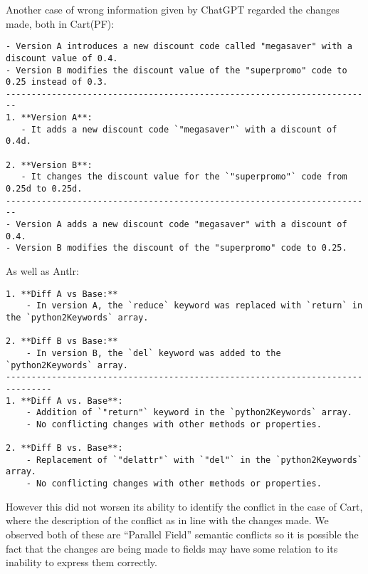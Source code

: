 Another case of wrong information given by ChatGPT regarded the changes made, both in Cart(PF):
\begin{lstlisting}
- Version A introduces a new discount code called "megasaver" with a discount value of 0.4.
- Version B modifies the discount value of the "superpromo" code to 0.25 instead of 0.3.
------------------------------------------------------------------------
1. **Version A**:
   - It adds a new discount code `"megasaver"` with a discount of 0.4d.

2. **Version B**:
   - It changes the discount value for the `"superpromo"` code from 0.25d to 0.25d.
------------------------------------------------------------------------
- Version A adds a new discount code "megasaver" with a discount of 0.4.
- Version B modifies the discount of the "superpromo" code to 0.25.
\end{lstlisting}
As well as Antlr:
\begin{lstlisting}
1. **Diff A vs Base:**
    - In version A, the `reduce` keyword was replaced with `return` in the `python2Keywords` array.
 
2. **Diff B vs Base:**
    - In version B, the `del` keyword was added to the `python2Keywords` array.
-------------------------------------------------------------------------------
1. **Diff A vs. Base**:
    - Addition of `"return"` keyword in the `python2Keywords` array.
    - No conflicting changes with other methods or properties.
 
2. **Diff B vs. Base**:
    - Replacement of `"delattr"` with `"del"` in the `python2Keywords` array.
    - No conflicting changes with other methods or properties.
\end{lstlisting}
However this did not worsen its ability to identify the conflict in the case of Cart, where the description of the conflict as in line with the changes made.
We observed both of these are ``Parallel Field'' semantic conflicts so it is possible the fact that the changes are being made to fields may have some relation to its inability to express them correctly.

